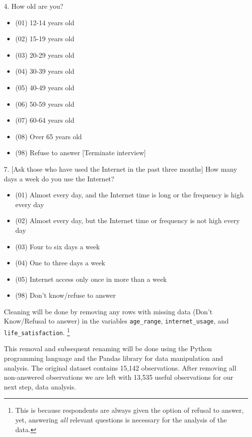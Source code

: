 \documentclass[12pt, a4paper]{article}
\begin{document}
\bigskip
\footnotesize

\par 4. How old are you?
\begin{itemize}
    \item (01)  12-14  years  old
    \item (02)  15-19  years  old
    \item (03)  20-29  years  old
    \item (04)  30-39  years  old
    \item (05)  40-49  years  old
    \item (06)  50-59  years  old
    \item (07)  60-64  years  old
    \item (08)  Over  65  years  old
    \item (98)  Refuse  to  answer  [Terminate interview]
\end{itemize}

\bigskip

\par \footnotesize 7. [Ask those who have used the Internet in the past three months] How many days a week do you use the Internet?
\begin{itemize}
    \item (01) Almost every day, and the Internet time is long or the frequency is high every day
    \item (02) Almost every day, but the Internet time or frequency is not high every day
    \item (03) Four to six days a week
    \item (04) One to three days a week
    \item (05) Internet access only once in more than a week
    \item (98) Don't know/refuse to answer
\end{itemize}


\normalsize \bigskip

\par Cleaning will be done by removing any rows with missing data \footnotesize(Don't Know/Refusal to answer) \normalsize in the variables \texttt{age\_range}, \texttt{internet\_usage}, and \texttt{life\_satisfaction}.
\footnote{This is because respondents are always given the option of refusal to answer, yet, answering \textit{all} relevant questions is necessary for the analysis of the data.}
\par This removal and subsequent renaming will be done using the Python programming language and the Pandas library for data manipulation and analysis.
The original dataset contains 15,142 observations. After removing all non-answered observations we are left with 13,535 useful observations for our next step, data analysis.
\end{document}
